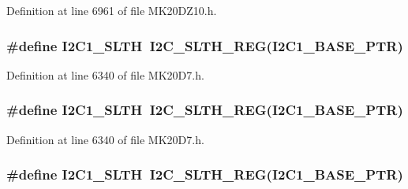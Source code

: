 Definition at line 6961 of file M\+K20\+D\+Z10.\+h.

\subsubsection[{\texorpdfstring{I2\+C1\+\_\+\+S\+L\+TH}{I2C1_SLTH}}]{\setlength{\rightskip}{0pt plus 5cm}\#define I2\+C1\+\_\+\+S\+L\+TH~{\bf I2\+C\+\_\+\+S\+L\+T\+H\+\_\+\+R\+EG}({\bf I2\+C1\+\_\+\+B\+A\+S\+E\+\_\+\+P\+TR})}\hypertarget{group___i2_c___register___accessor___macros_ga636aa70cc9b9d94328cecb67e0005e7b}{}\label{group___i2_c___register___accessor___macros_ga636aa70cc9b9d94328cecb67e0005e7b}


Definition at line 6340 of file M\+K20\+D7.\+h.

\subsubsection[{\texorpdfstring{I2\+C1\+\_\+\+S\+L\+TH}{I2C1_SLTH}}]{\setlength{\rightskip}{0pt plus 5cm}\#define I2\+C1\+\_\+\+S\+L\+TH~{\bf I2\+C\+\_\+\+S\+L\+T\+H\+\_\+\+R\+EG}({\bf I2\+C1\+\_\+\+B\+A\+S\+E\+\_\+\+P\+TR})}\hypertarget{group___i2_c___register___accessor___macros_ga636aa70cc9b9d94328cecb67e0005e7b}{}\label{group___i2_c___register___accessor___macros_ga636aa70cc9b9d94328cecb67e0005e7b}


Definition at line 6340 of file M\+K20\+D7.\+h.

\subsubsection[{\texorpdfstring{I2\+C1\+\_\+\+S\+L\+TH}{I2C1_SLTH}}]{\setlength{\rightskip}{0pt plus 5cm}\#define I2\+C1\+\_\+\+S\+L\+TH~{\bf I2\+C\+\_\+\+S\+L\+T\+H\+\_\+\+R\+EG}({\bf I2\+C1\+\_\+\+B\+A\+S\+E\+\_\+\+P\+TR})}\hypertarget{group___i2_c___register___accessor___macros_ga636aa70cc9b9d94328cecb67e0005e7b}{}\label{group___i2_c___register___accessor___macros_ga636aa70cc9b9d94328cecb67e0005e7b}



